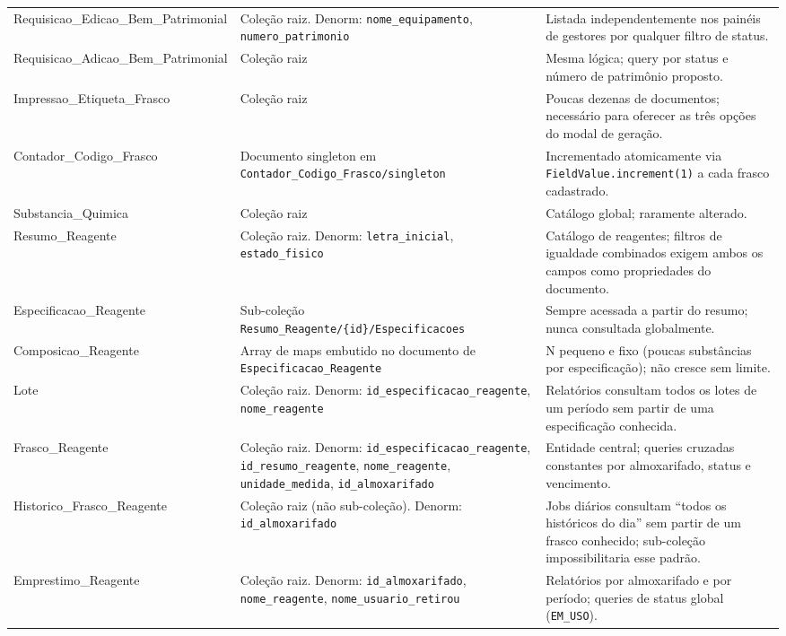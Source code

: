 \documentclass[12pt,a4paper]{article}
\begin{document}
\begin{center}
\begin{longtable}{>{\raggedright\arraybackslash}p{} >{\raggedright\arraybackslash}p{} >{\raggedright\arraybackslash}X}
Requisicao\_Edicao\_Bem\_Patrimonial & Coleção raiz. Denorm: \texttt{nome\_equipamento}, \texttt{numero\_patrimonio} & Listada independentemente nos painéis de gestores por qualquer filtro de status.\\
Requisicao\_Adicao\_Bem\_Patrimonial & Coleção raiz & Mesma lógica; query por status e número de patrimônio proposto.\\
Impressao\_Etiqueta\_Frasco & Coleção raiz & Poucas dezenas de documentos; necessário para oferecer as três opções do modal de geração.\\
Contador\_Codigo\_Frasco & Documento singleton em \texttt{Contador\_Codigo\_Frasco/singleton} & Incrementado atomicamente via \texttt{FieldValue.increment(1)} a cada frasco cadastrado.\\
Substancia\_Quimica & Coleção raiz & Catálogo global; raramente alterado.\\
Resumo\_Reagente & Coleção raiz. Denorm: \texttt{letra\_inicial}, \texttt{estado\_fisico} & Catálogo de reagentes; filtros de igualdade combinados exigem ambos os campos como propriedades do documento.\\
Especificacao\_Reagente & Sub-coleção \texttt{Resumo\_Reagente/\{id\}/Especificacoes} & Sempre acessada a partir do resumo; nunca consultada globalmente.\\
Composicao\_Reagente & Array de maps embutido no documento de \texttt{Especificacao\_Reagente} & N pequeno e fixo (poucas substâncias por especificação); não cresce sem limite.\\
Lote & Coleção raiz. Denorm: \texttt{id\_especificacao\_reagente}, \texttt{nome\_reagente} & Relatórios consultam todos os lotes de um período sem partir de uma especificação conhecida.\\
Frasco\_Reagente & Coleção raiz. Denorm: \texttt{id\_especificacao\_reagente}, \texttt{id\_resumo\_reagente}, \texttt{nome\_reagente}, \texttt{unidade\_medida}, \texttt{id\_almoxarifado} & Entidade central; queries cruzadas constantes por almoxarifado, status e vencimento.\\
Historico\_Frasco\_Reagente & Coleção raiz (não sub-coleção). Denorm: \texttt{id\_almoxarifado} & Jobs diários consultam ``todos os históricos do dia'' sem partir de um frasco conhecido; sub-coleção impossibilitaria esse padrão.\\
Emprestimo\_Reagente & Coleção raiz. Denorm: \texttt{id\_almoxarifado}, \texttt{nome\_reagente}, \texttt{nome\_usuario\_retirou} & Relatórios por almoxarifado e por período; queries de status global (\texttt{EM\_USO}).\\

\end{longtable}
\end{center}
\end{document}
